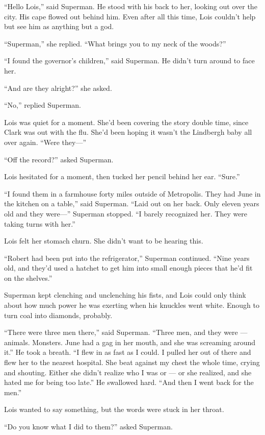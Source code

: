 ``Hello Lois,'' said Superman. He stood with his back to her, looking
out over the city. His cape flowed out behind him. Even after all this
time, Lois couldn't help but see him as anything but a god.

``Superman,'' she replied. ``What brings you to my neck of the woods?''

``I found the governor's children,'' said Superman. He didn't turn
around to face her.

``And are they alright?'' she asked.

``No,'' replied Superman.

Lois was quiet for a moment. She'd been covering the story double time,
since Clark was out with the flu. She'd been hoping it wasn't the
Lindbergh baby all over again. ``Were they---''

``Off the record?'' asked Superman.

Lois hesitated for a moment, then tucked her pencil behind her ear.
``Sure.''

``I found them in a farmhouse forty miles outside of Metropolis. They
had June in the kitchen on a table,'' said Superman. ``Laid out on her
back. Only eleven years old and they were---'' Superman stopped. ``I
barely recognized her. They were taking turns with her.''

Lois felt her stomach churn. She didn't want to be hearing this.

``Robert had been put into the refrigerator,'' Superman continued.
``Nine years old, and they'd used a hatchet to get him into small enough
pieces that he'd fit on the shelves.''

Superman kept clenching and unclenching his fists, and Lois could only
think about how much power he was exerting when his knuckles went white.
Enough to turn coal into diamonds, probably.

``There were three men there,'' said Superman. ``Three men, and they
were --- animals. Monsters. June had a gag in her mouth, and she was
screaming around it.'' He took a breath. ``I flew in as fast as I could.
I pulled her out of there and flew her to the nearest hospital. She beat
against my chest the whole time, crying and shouting. Either she didn't
realize who I was or --- or she realized, and she hated me for being too
late.'' He swallowed hard. ``And then I went back for the men.''

Lois wanted to say something, but the words were stuck in her throat.

``Do you know what I did to them?'' asked Superman.

